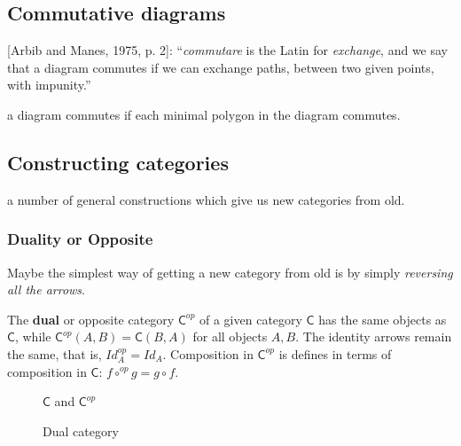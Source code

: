 \subsection{Commutative diagrams}


[Arbib and Manes, 1975, p. 2]: 
``\textit{commutare} is the Latin for \textit{exchange}, 
and we say that a diagram commutes if we can exchange paths, 
between two given points, with impunity.''



a diagram commutes if each minimal polygon in the diagram commutes.





\subsection{Constructing categories}

a number of general constructions which give us new categories from old.



\subsubsection{Duality or Opposite}

Maybe the simplest way of getting a new category from old is by simply \textit{reversing all the arrows}. 

\begin{df}
	The \textbf{dual} or \textsf{opposite category} {\color{red} $\mathsf{C}^{op}$} of a given category $\mathsf{C}$ has the same objects as $\mathsf{C}$, 
	while $\mathsf{C}^{op}(A,B) = \mathsf{C}(B,A)$ for all objects $A,B$.
	The identity arrows remain the same, 
	that is, 
	$Id^{op}_A = Id_A$.
	Composition in $\mathsf{C}^{op}$ is defines in terms of composition in $\mathsf{C}$: 
	$f \circ^{op} g = g \circ f$. 
\end{df}


\begin{figure}[h]
	\centering
		
		$\mathsf{C}$ and $\mathsf{C}^{op}$
	\caption{Dual category}
	\label{fig: dual-category}
\end{figure}


